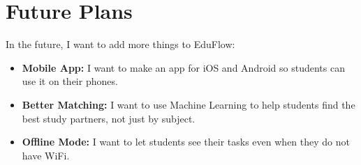 \documentclass[12pt,a4paper]{report}
\begin{document}
\section{Future Plans}
In the future, I want to add more things to EduFlow:
\begin{itemize}
    \item \textbf{Mobile App:} I want to make an app for iOS and Android so students can use it on their phones.
    \item \textbf{Better Matching:} I want to use Machine Learning to help students find the best study partners, not just by subject.
    \item \textbf{Offline Mode:} I want to let students see their tasks even when they do not have WiFi.
\end{itemize}
\end{document}
